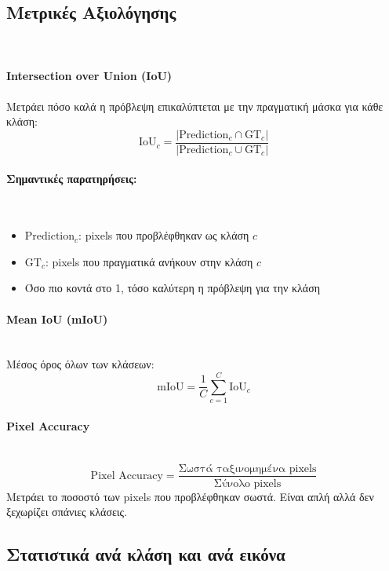 \documentclass[12pt]{article}
\begin{document}
    \subsection{Μετρικές Αξιολόγησης}
    \mbox{}\\
    \paragraph{Intersection over Union (IoU)}
    Μετράει πόσο καλά η πρόβλεψη επικαλύπτεται με την πραγματική μάσκα για κάθε κλάση:
    \[
    \text{IoU}_c = \frac{|\text{Prediction}_c \cap \text{GT}_c|}{|\text{Prediction}_c \cup \text{GT}_c|}
    \]
    
    \paragraph{Σημαντικές παρατηρήσεις:}
    \mbox{}\\
    \begin{itemize}
        \item \(\text{Prediction}_c\): pixels που προβλέφθηκαν ως κλάση \(c\)
        \item \(\text{GT}_c\): pixels που πραγματικά ανήκουν στην κλάση \(c\)
        \item Όσο πιο κοντά στο 1, τόσο καλύτερη η πρόβλεψη για την κλάση
    \end{itemize}
    
    \paragraph{Mean IoU (mIoU)}
    \mbox{}\\
    Μέσος όρος όλων των κλάσεων:
    \[
    \text{mIoU} = \frac{1}{C} \sum_{c=1}^{C} \text{IoU}_c
    \]
    
    \paragraph{Pixel Accuracy}
    \mbox{}\\
    \[
    \text{Pixel Accuracy} = \frac{\text{Σωστά ταξινομημένα pixels}}{\text{Σύνολο pixels}}
    \]
    Μετράει το ποσοστό των pixels που προβλέφθηκαν σωστά. Είναι απλή αλλά δεν ξεχωρίζει σπάνιες κλάσεις.
    
    \subsection{Στατιστικά ανά κλάση και ανά εικόνα}
    
\end{document}
